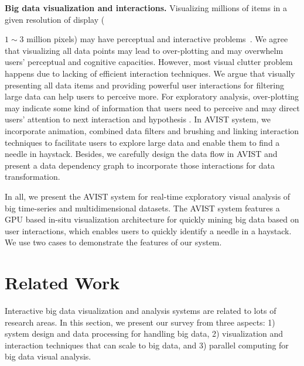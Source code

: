 \documentclass[journal]{vgtc}                %
\begin{document}
\textbf{Big data visualization and interactions.} Visualizing millions of items in a given resolution of display ({$1{\sim}3$ million pixels) may have perceptual and interactive problems~\cite{2013-immens}. We agree that visualizing all data points may lead to over-plotting and may overwhelm users' perceptual and cognitive capacities. However, most visual clutter problem happens due to lacking of efficient interaction techniques. We argue that visually presenting all data items and providing powerful user interactions for filtering large data can help users to perceive more. For exploratory analysis, over-plotting may indicate some kind of information that users need to perceive and may direct users' attention to  next interaction and hypothesis . In AVIST system, we incorporate animation, combined data filters and brushing and linking interaction techniques to facilitate users to explore large data and enable them to find a needle in haystack. Besides, we carefully design the data flow in AVIST and present a data dependency graph to incorporate those interactions for data transformation. 
	 
In all, we present the AVIST system for real-time exploratory visual analysis of big time-series and multidimensional datasets. The AVIST system features a GPU based in-situ visualization architecture for quickly mining big data based on user interactions, which enables users to quickly identify a needle in a haystack. We use two cases to demonstrate the features of our system.


      


\section{Related Work}
Interactive big data visualization and analysis systems are related to lots of research areas.
In this section, we present our survey from three aspects: 1) system design and data processing for handling big data, 2) visualization and interaction techniques that can scale to big data, and 3) parallel computing for big data visual analysis. 
 


}
\end{document}
